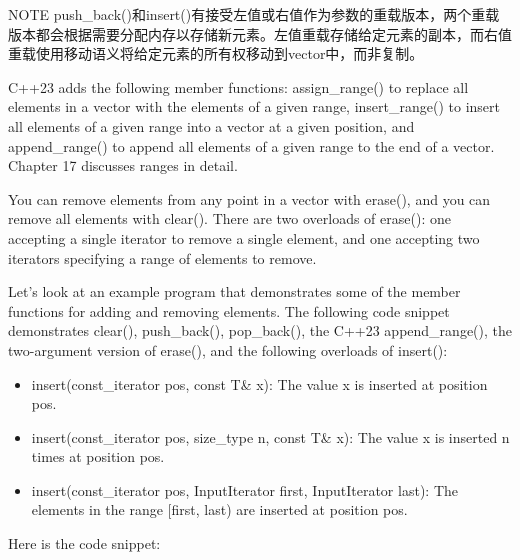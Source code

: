 \begin{myNotic}{NOTE}
push\_back()和insert()有接受左值或右值作为参数的重载版本，两个重载版本都会根据需要分配内存以存储新元素。左值重载存储给定元素的副本，而右值重载使用移动语义将给定元素的所有权移动到vector中，而非复制。
\end{myNotic}


C++23 adds the following member functions: assign\_range() to replace all elements in a vector with the elements of a given range, insert\_range() to insert all elements of a given range into a vector at a given position, and append\_range() to append all elements of a given range to the end of a vector. Chapter 17 discusses ranges in detail.

You can remove elements from any point in a vector with erase(), and you can remove all elements with clear(). There are two overloads of erase(): one accepting a single iterator to remove a single element, and one accepting two iterators specifying a range of elements to remove.

Let’s look at an example program that demonstrates some of the member functions for adding and removing elements. The following code snippet demonstrates clear(), push\_back(), pop\_back(), the C++23 append\_range(), the two-argument version of erase(), and the following overloads of insert():

\begin{itemize}
\item
insert(const\_iterator pos, const T\& x): The value x is inserted at position pos.

\item
insert(const\_iterator pos, size\_type n, const T\& x): The value x is inserted n times at position pos.

\item
insert(const\_iterator pos, InputIterator first, InputIterator last): The elements in the range [first, last) are inserted at position pos.
\end{itemize}

Here is the code snippet:

